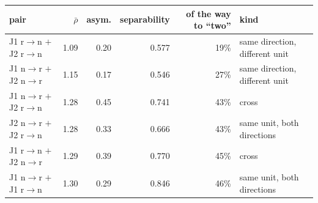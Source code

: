 \begin{tabular}{lrrrrl}
\toprule
pair & $\bar\rho$ & asym. & separability & of the way to ``two'' & kind \\
\midrule
J1 r$\to$n $+$ J2 r$\to$n & 1.09 & 0.20 & 0.577 & 19\% & same direction, different unit \\
J1 n$\to$r $+$ J2 n$\to$r & 1.15 & 0.17 & 0.546 & 27\% & same direction, different unit \\
J1 n$\to$r $+$ J2 r$\to$n & 1.28 & 0.45 & 0.741 & 43\% & cross \\
J2 n$\to$r $+$ J2 r$\to$n & 1.28 & 0.33 & 0.666 & 43\% & same unit, both directions \\
J1 r$\to$n $+$ J2 n$\to$r & 1.29 & 0.39 & 0.770 & 45\% & cross \\
J1 n$\to$r $+$ J1 r$\to$n & 1.30 & 0.29 & 0.846 & 46\% & same unit, both directions \\
\bottomrule
\end{tabular}
